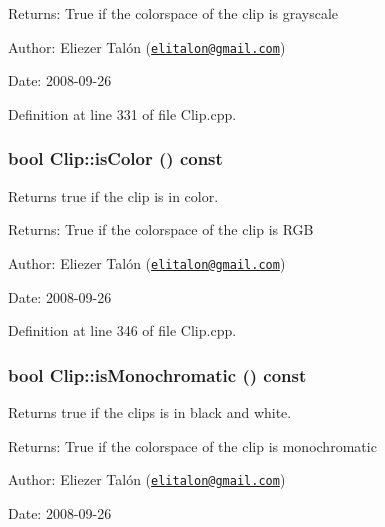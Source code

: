 \begin{Desc}
\item[Returns:]True if the colorspace of the clip is grayscale\end{Desc}
\begin{Desc}
\item[Author:]Eliezer Talón (\href{mailto:elitalon@gmail.com}{\tt elitalon@gmail.com}) \end{Desc}
\begin{Desc}
\item[Date:]2008-09-26 \end{Desc}


Definition at line 331 of file Clip.cpp.\hypertarget{class_clip_0a535167abd0a544a2de56c317bb6f3c}{
\subsubsection[isColor]{\setlength{\rightskip}{0pt plus 5cm}bool Clip::isColor () const}}
\label{class_clip_0a535167abd0a544a2de56c317bb6f3c}


Returns true if the clip is in color. 

\begin{Desc}
\item[Returns:]True if the colorspace of the clip is RGB\end{Desc}
\begin{Desc}
\item[Author:]Eliezer Talón (\href{mailto:elitalon@gmail.com}{\tt elitalon@gmail.com}) \end{Desc}
\begin{Desc}
\item[Date:]2008-09-26 \end{Desc}


Definition at line 346 of file Clip.cpp.\hypertarget{class_clip_5045f79876d4299b54803d56b26d5f75}{
\subsubsection[isMonochromatic]{\setlength{\rightskip}{0pt plus 5cm}bool Clip::isMonochromatic () const}}
\label{class_clip_5045f79876d4299b54803d56b26d5f75}


Returns true if the clips is in black and white. 

\begin{Desc}
\item[Returns:]True if the colorspace of the clip is monochromatic\end{Desc}
\begin{Desc}
\item[Author:]Eliezer Talón (\href{mailto:elitalon@gmail.com}{\tt elitalon@gmail.com}) \end{Desc}
\begin{Desc}
\item[Date:]2008-09-26 \end{Desc}


